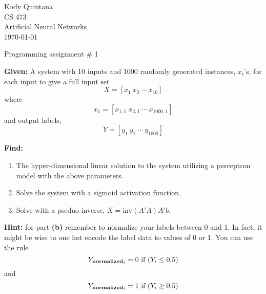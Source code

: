 \documentclass[14pt]{article}
\begin{document}
\begin{flushleft}
 
\large
Kody Quintana\\
CS 473\\
Artificial Neural Networks\\
\today\\
\boldmath

\begin{center}
Programming assignment \# 1
\end{center}

\question
\textbf{Given:}
	A system with 10 inputs and 1000 randomly generated instances, $x_i$'s,
	for each input to give a full input set
	\[X = [x_1  \ x_2  \ \cdots \ x_{10}]\]
	where
	\[x_1 = [x_{1,1} \  x_{2,1}  \ \cdots \  x_{1000,1}]\]
	and output labels,
	\[Y = [y_1 \ y_2 \ \cdots \ y_{1000}]\]
\closequestion

\question
\textbf{Find:}
	\begin{enumerate}[label = \textbf{(\alph*)}]
	\item
		The hyper-dimensional linear solution to the system
		utilizing a perceptron model with the above parameters.
	\item
		Solve the system with a sigmoid activation function.
	\item
		Solve with a pseduo-inverse, $X = \text{inv}(A'A)A'b.$
	\end{enumerate}
\closequestion


\question
\textbf{Hint:}
	for part \textbf{(b)} remember to normalize your labels between 0 and 1.
	In fact, it might be wise to one hot encode the label data to values of 0 or 1.
	You can use the rule
	\[Y_{\text{\textbf{normalized}}_{i}} = 0
	\ \text{if} \
	(Y_i \leq 0.5)\]
	and 
	\[Y_{\text{\textbf{normalized}}_{i}} = 1
	\ \text{if} \
	(Y_i \geq 0.5)\]
\closequestion




\end{flushleft}
\end{document}
